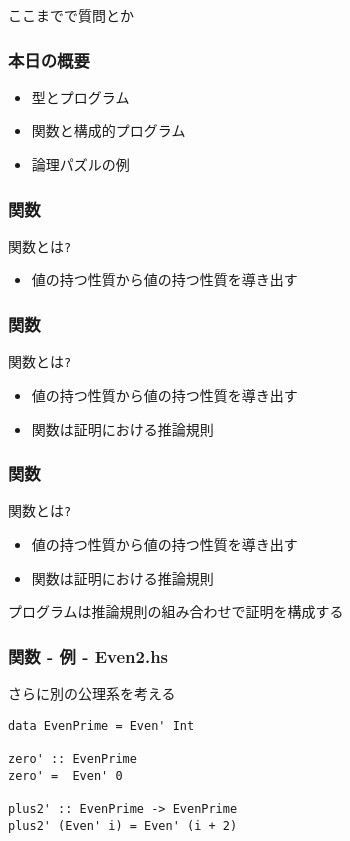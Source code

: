 \documentclass[cjk,dvipdfm,14pt]{beamer}
\begin{document}
\begin{frame}[fragile]
ここまでで質問とか
\end{frame}

\begin{frame}[fragile]
\frametitle{本日の概要}

\begin{itemize}
\item 型とプログラム
\item { \color{red} 関数と構成的プログラム }
\item 論理パズルの例
\end{itemize}

\end{frame}

\begin{frame}[fragile]
\frametitle{関数}

関数とは\verb|?|
\begin{itemize}
\item { \color{red} 値の持つ性質から値の持つ性質を導き出す}
\end{itemize}

\end{frame}

\begin{frame}[fragile]
\frametitle{関数}

関数とは\verb|?|
\begin{itemize}
\item 値の持つ性質から値の持つ性質を導き出す
\item { \color{red} 関数は証明における推論規則 }
\end{itemize}


\end{frame}

\begin{frame}[fragile]
\frametitle{関数}

関数とは\verb|?|
\begin{itemize}
\item 値の持つ性質から値の持つ性質を導き出す
\item 関数は証明における推論規則
\end{itemize}

{ \color{red} プログラムは推論規則の組み合わせで証明を構成する }

\end{frame}

\begin{frame}[fragile]
\frametitle{関数 - 例 - Even2.hs}

さらに別の公理系を考える
\begin{lstlisting}
data EvenPrime = Even' Int

zero' :: EvenPrime
zero' =  Even' 0

plus2' :: EvenPrime -> EvenPrime
plus2' (Even' i) = Even' (i + 2)
\end{lstlisting}

\end{frame}
\end{document}
